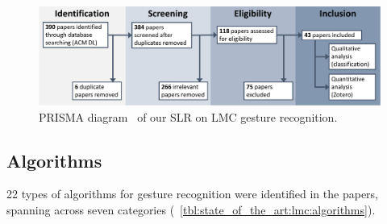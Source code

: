\begin{figure}[htb]
    \centering
    \includegraphics[width=\linewidth]{Figures/StateOfTheArt/LMC/PRISMA-LMC.pdf}
    \vspace{-18pt}
    \caption{PRISMA diagram~\cite{Page:2021} of our SLR on LMC gesture recognition.}
    \label{fig:state_of_the_art:lmc:prisma}
    \vspace{-8pt}
\end{figure}

\subsection{Algorithms} \label{sec:state_of_the_art:lmc:algorithms}
22 types of algorithms for gesture recognition were identified in the papers, spanning across seven categories (\tab~\ref{tbl:state_of_the_art:lmc:algorithms}).

